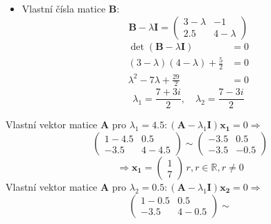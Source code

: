 \begin{mathexam}
  \begin{itemize}
    \item Vlastní čísla matice \textbf{B}:
      \begin{equation*}
          \textbf{B} - \lambda\textbf{I}=
            \begin{pmatrix}
              3-\lambda  & -1             \\
              2.5        &  4-\lambda
            \end{pmatrix}
      \end{equation*}
      \begin{align*}
        \det(\mathbf{B}-\lambda\mathbf{I}) &= 0 \\
        (3-\lambda)(4-\lambda)+\frac{5}{2} &= 0 \\
        \lambda^2-7\lambda+\frac{29}{2}    &= 0
      \end{align*}
      \begin{equation*}
        \lambda_1 = \frac{7+3i}{2},\quad \lambda_2 = \frac{7-3i}{2}
      \end{equation*}
  \end{itemize}
  Vlastní vektor matice \(\mathbf{A}\) pro \(\lambda_1=4.5: (\mathbf{A} -
  \lambda_1\mathbf{I})\mathbf{x_1} = 0 \Rightarrow\)
  \begin{equation*}
    \begin{pmatrix}
      1  -4.5  &  0.5     \\
      -3.5     &  4-4.5
    \end{pmatrix}
    \sim
    \begin{pmatrix}
      -3.5  &  0.5         \\
      -3.5  & -0.5
    \end{pmatrix}
  \end{equation*}
  \begin{equation*}
    \Rightarrow\mathbf{x_1} =
    \begin{pmatrix}
      1 \\ 7
    \end{pmatrix}
    \, r, r\in\mathbb{R}, r\neq0
  \end{equation*}
  Vlastní vektor matice \(\mathbf{A}\) pro \(\lambda_2=0.5: (\mathbf{A} -
  \lambda_1\mathbf{I})\mathbf{x_2}=0 \Rightarrow\)
  \begin{equation*}
    \begin{pmatrix}
      1  -0.5  &  0.5   \\
      -3.5      &  4-0.5
    \end{pmatrix}
    \sim

\end{equation*}
\end{mathexam}
